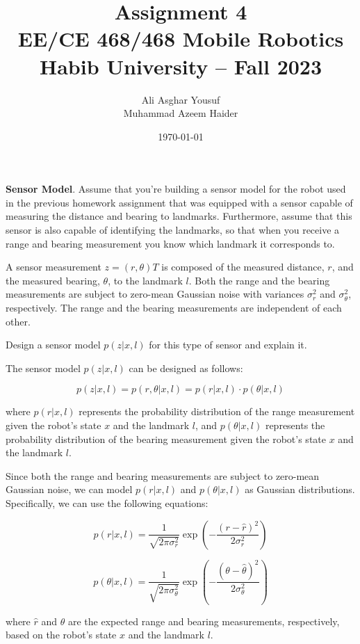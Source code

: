\documentclass[answers]{exam}
\title{Assignment 4\\ EE/CE 468/468 Mobile Robotics\\ Habib University -- Fall 2023}
\author{Ali Asghar Yousuf \\ Muhammad Azeem Haider }
\date{\today}
\begin{document}
\maketitle

\begin{questions}
    \question[25]
    \textbf{Sensor Model}. Assume that you're building a sensor model for the robot used in the previous homework assignment that was equipped with a sensor capable of measuring the distance
    and bearing to landmarks. Furthermore, assume that this sensor is also capable of identifying
    the landmarks, so that when you receive a range and bearing measurement you know which
    landmark it corresponds to.

    A sensor measurement $z = (r, \theta)T$ is composed of the measured distance, $r$, and the measured
    bearing, $\theta$, to the landmark $l$. Both the range and the bearing measurements are subject to
    zero-mean Gaussian noise with variances $\sigma_r^2$ and $\sigma_\theta^2$, respectively. The range and the bearing
    measurements are independent of each other.

    Design a sensor model $p(z|x, l)$ for this type of sensor and explain it.

    \begin{solution}
    The sensor model $p(z|x, l)$ can be designed as follows:

    \[
    p(z|x, l) = p(r, \theta|x, l) = p(r|x, l) \cdot p(\theta|x, l)
    \]

    where $p(r|x, l)$ represents the probability distribution of the range measurement given the robot's state $x$ and the landmark $l$, and $p(\theta|x, l)$ represents the probability distribution of the bearing measurement given the robot's state $x$ and the landmark $l$.

    Since both the range and bearing measurements are subject to zero-mean Gaussian noise, we can model $p(r|x, l)$ and $p(\theta|x, l)$ as Gaussian distributions. Specifically, we can use the following equations:

    \[
    p(r|x, l) = \frac{1}{\sqrt{2\pi\sigma_r^2}} \exp\left(-\frac{(r - \hat{r})^2}{2\sigma_r^2}\right)
    \]

    \[
    p(\theta|x, l) = \frac{1}{\sqrt{2\pi\sigma_\theta^2}} \exp\left(-\frac{(\theta - \hat{\theta})^2}{2\sigma_\theta^2}\right)
    \]

    where $\hat{r}$ and $\hat{\theta}$ are the expected range and bearing measurements, respectively, based on the robot's state $x$ and the landmark $l$.


\end{solution}
\end{questions}
\end{document}
